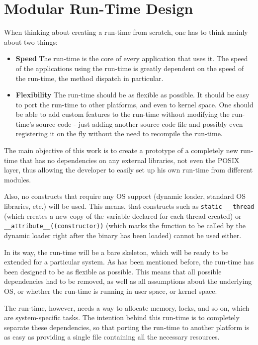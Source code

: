 \chapter{Modular Run-Time Design}

When thinking about creating a run-time from scratch, one has to think mainly about two things:

\begin{itemize}
  \item{\bf{Speed}} The run-time is the core of every application that uses it. The speed of the applications using the run-time is greatly dependent on the speed of the run-time, the method dispatch in particular.
  \item{\bf{Flexibility}} The run-time should be as flexible as possible. It should be easy to port the run-time to other platforms, and even to kernel space. One should be able to add custom features to the run-time without modifying the run-time's source code - just adding another source code file and possibly even registering it on the fly without the need to recompile the run-time.
\end{itemize}

The main objective of this work is to create a prototype of a completely new run-time that has no dependencies on any external libraries, not even the POSIX layer, thus allowing the developer to easily set up his own run-time from different modules.

Also, no constructs that require any OS support (dynamic loader, standard OS libraries, etc.) will be used. This means, that constructs such as \verb=static __thread= (which creates a new copy of the variable declared for each thread created) or \newline{} \verb=__attribute__((constructor))= (which marks the function to be called by the dynamic loader right after the binary has been loaded) cannot be used either.

In its way, the run-time will be a bare skeleton, which will be ready to be extended for a particular system. As has been mentioned before, the run-time has been designed to be as flexible as possible. This means that all possible dependencies had to be removed, as well as all assumptions about the underlying OS, or whether the run-time is running in user space, or kernel space.

The run-time, however, needs a way to allocate memory, locks, and so on, which are system-specific tasks. The intention behind this run-time is to completely separate these dependencies, so that porting the run-time to another platform is as easy as providing a single file containing all the necessary resources.

